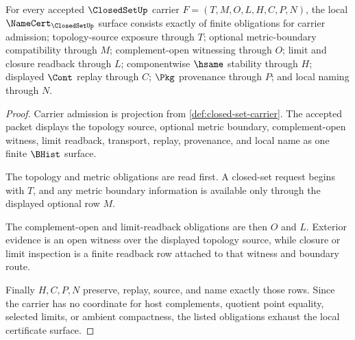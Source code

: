 \begin{theorem}
\label{thm:closed-set-namecert-obligations}
For every accepted $\ClosedSetUp$ carrier $F=(T,M,O,L,H,C,P,N)$, the local $\NameCert_{\ClosedSetUp}$ surface consists exactly of finite obligations for carrier admission; topology-source exposure through $T$; optional metric-boundary compatibility through $M$; complement-open witnessing through $O$; limit and closure readback through $L$; componentwise $\hsame$ stability through $H$; displayed $\Cont$ replay through $C$; $\Pkg$ provenance through $P$; and local naming through $N$.
\end{theorem}
\begin{proof}
Carrier admission is projection from \autoref{def:closed-set-carrier}. The accepted packet displays the topology source, optional metric boundary, complement-open witness, limit readback, transport, replay, provenance, and local name as one finite $\BHist$ surface.

The topology and metric obligations are read first. A closed-set request begins with $T$, and any metric boundary information is available only through the displayed optional row $M$.

The complement-open and limit-readback obligations are then $O$ and $L$. Exterior evidence is an open witness over the displayed topology source, while closure or limit inspection is a finite readback row attached to that witness and boundary route.

Finally $H,C,P,N$ preserve, replay, source, and name exactly those rows. Since the carrier has no coordinate for host complements, quotient point equality, selected limits, or ambient compactness, the listed obligations exhaust the local certificate surface.
\end{proof}

